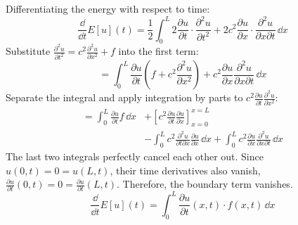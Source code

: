 \begin{proofbox}
Differentiating the energy with respect to time:
\begin{equation*}
    \frac{\dd}{\dd t} E[u](t) = \frac{1}{2} \int_0^L 2\frac{\partial u}{\partial t} \cdot \frac{\partial^2 u}{\partial t^2} + 2c^2 \frac{\partial u}{\partial x} \cdot \frac{\partial^2 u}{\partial x \partial t} \, \dd x
\end{equation*}
Substitute $\frac{\partial^2 u}{\partial t^2} = c^2 \frac{\partial^2 u}{\partial x^2} + f$ into the first term:
\begin{equation*}
    = \int_0^L \frac{\partial u}{\partial t} \left( f + c^2 \frac{\partial^2 u}{\partial x^2} \right) + c^2 \frac{\partial u}{\partial x} \frac{\partial^2 u}{\partial x \partial t} \, \dd x
\end{equation*}
Separate the integral and apply integration by parts to $c^2 \frac{\partial u}{\partial t} \frac{\partial^2 u}{\partial x^2}$:
\begin{align*}
    = \int_0^L \frac{\partial u}{\partial t} f \, \dd x &+ \left[ c^2 \frac{\partial u}{\partial t} \frac{\partial u}{\partial x} \right]_{x=0}^{x=L} \\
    &- \int_0^L c^2 \frac{\partial^2 u}{\partial t \partial x} \frac{\partial u}{\partial x} \, \dd x + \int_0^L c^2 \frac{\partial u}{\partial x} \frac{\partial^2 u}{\partial x \partial t} \, \dd x
\end{align*}
The last two integrals perfectly cancel each other out. Since $u(0,t) = 0 = u(L,t)$, their time derivatives also vanish, $\frac{\partial u}{\partial t}(0,t) = 0 = \frac{\partial u}{\partial t}(L,t)$. Therefore, the boundary term vanishes.
\begin{equation*}
    \frac{\dd}{\dd t} E[u](t) = \int_0^L \frac{\partial u}{\partial t}(x,t) \cdot f(x,t) \, \dd x
\end{equation*}
\end{proofbox}

